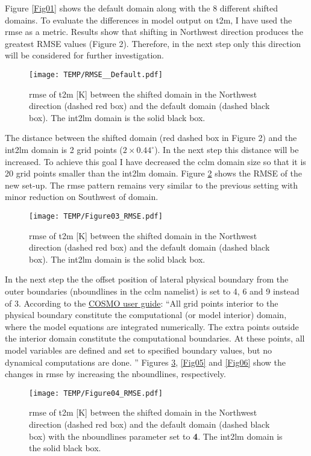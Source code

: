 \documentclass[a4paper,10pt]{report}
\begin{document}
Figure \ref{Fig01} shows the default domain along with the 8 different shifted domains. To evaluate the differences in model output on \ac{t2m}, I have used the \ac{rmse} as a metric. Results show that shifting in Northwest direction produces the greatest RMSE values (Figure 2). Therefore, in the next step only this direction will be considered for further investigation. 
\begin{figure}%
\texttt{[image: TEMP/RMSE\_\_Default.pdf]}
\caption{\ac{rmse} of \ac{t2m} [K] between the shifted domain in the Northwest direction (dashed red box) and the default domain (dashed black box). The int2lm domain is the solid black box.}
\label{Fig02}
\end{figure}

The distance between the shifted domain (red dashed box in Figure 2) and the int2lm domain is 2 grid points ($2 \times 0.44^\circ$). In the next step this distance will be increased. To achieve this goal I have decreased the \ac{cclm} domain size so that it is 20 grid points smaller than the int2lm domain. Figure \ref{Fig03} shows the RMSE of the new set-up. The \ac{rmse} pattern remains very similar to the previous setting with minor reduction on Southwest of domain.\par

\begin{figure}%
\texttt{[image: TEMP/Figure03\_RMSE.pdf]}
\caption{\ac{rmse} of \ac{t2m} [K] between the shifted domain in the Northwest direction (dashed red box) and the default domain (dashed black box). The int2lm domain is the solid black box.}
\label{Fig03}
\end{figure}

In the next step the the offset position of lateral physical boundary from the outer boundaries (nboundlines in the \ac{cclm} namelist) is set to 4, 6 and 9 instead of 3. According to the \href{http://www2.cosmo-model.org/content/model/documentation/core/cosmoUserGuide.pdf}{COSMO user guide}: ``All  grid  points  interior  to  the  physical  boundary  constitute  the  computational  (or  model interior)  domain,  where  the  model  equations  are  integrated  numerically. The extra points outside the interior domain constitute the computational boundaries. At these points, all model variables are defined and set to specified boundary values, but no dynamical  computations  are  done. '' Figures \ref{Fig04}, \ref{Fig05} and \ref{Fig06} show the changes in \ac{rmse} by increasing the nboundlines, respectively.
\begin{figure}%
\texttt{[image: TEMP/Figure04\_RMSE.pdf]}
\caption{\ac{rmse} of \ac{t2m} [K] between the shifted domain in the Northwest direction (dashed red box) and the default domain (dashed black box) with the nboundlines parameter set to \textbf{4}. The int2lm domain is the solid black box.}
\label{Fig04}
\end{figure}
\end{document}
